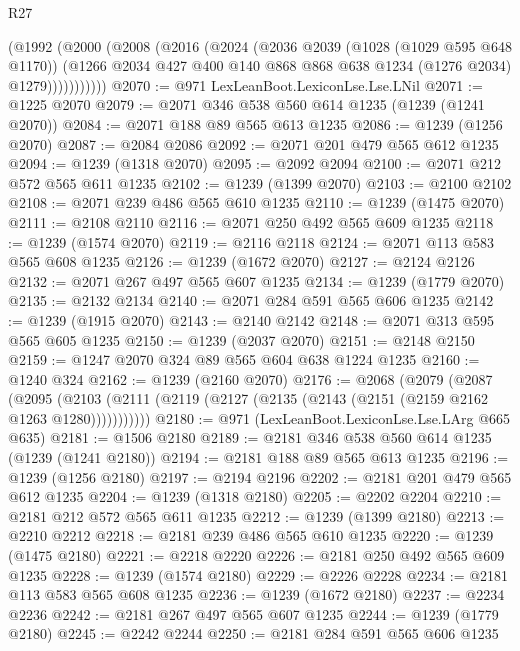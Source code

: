 \begin{lexlean}{R27}
\begin{coremodule}
            (@1992
              (@2000
                (@2008
                  (@2016
                    (@2024
                      (@2036
                        @2039
                        (@1028 (@1029 @595 @648 @1170))
                        (@1266
                          @2034
                          @427
                          @400
                          @140
                          @868
                          @868
                          @638
                          @1234
                          (@1276 @2034)
                          @1279)))))))))))
@2070 := @971 LexLeanBoot.LexiconLse.Lse.LNil
@2071 := @1225 @2070
@2079 := @2071 @346 @538 @560 @614 @1235 (@1239 (@1241 @2070))
@2084 := @2071 @188 @89 @565 @613 @1235
@2086 := @1239 (@1256 @2070)
@2087 := @2084 @2086
@2092 := @2071 @201 @479 @565 @612 @1235
@2094 := @1239 (@1318 @2070)
@2095 := @2092 @2094
@2100 := @2071 @212 @572 @565 @611 @1235
@2102 := @1239 (@1399 @2070)
@2103 := @2100 @2102
@2108 := @2071 @239 @486 @565 @610 @1235
@2110 := @1239 (@1475 @2070)
@2111 := @2108 @2110
@2116 := @2071 @250 @492 @565 @609 @1235
@2118 := @1239 (@1574 @2070)
@2119 := @2116 @2118
@2124 := @2071 @113 @583 @565 @608 @1235
@2126 := @1239 (@1672 @2070)
@2127 := @2124 @2126
@2132 := @2071 @267 @497 @565 @607 @1235
@2134 := @1239 (@1779 @2070)
@2135 := @2132 @2134
@2140 := @2071 @284 @591 @565 @606 @1235
@2142 := @1239 (@1915 @2070)
@2143 := @2140 @2142
@2148 := @2071 @313 @595 @565 @605 @1235
@2150 := @1239 (@2037 @2070)
@2151 := @2148 @2150
@2159 := @1247 @2070 @324 @89 @565 @604 @638 @1224 @1235
@2160 := @1240 @324
@2162 := @1239 (@2160 @2070)
@2176 := @2068
    (@2079
      (@2087
        (@2095 (@2103 (@2111 (@2119 (@2127 (@2135 (@2143 (@2151 (@2159 @2162 @1263 @1280)))))))))))
@2180 := @971 (LexLeanBoot.LexiconLse.Lse.LArg @665 @635)
@2181 := @1506 @2180
@2189 := @2181 @346 @538 @560 @614 @1235 (@1239 (@1241 @2180))
@2194 := @2181 @188 @89 @565 @613 @1235
@2196 := @1239 (@1256 @2180)
@2197 := @2194 @2196
@2202 := @2181 @201 @479 @565 @612 @1235
@2204 := @1239 (@1318 @2180)
@2205 := @2202 @2204
@2210 := @2181 @212 @572 @565 @611 @1235
@2212 := @1239 (@1399 @2180)
@2213 := @2210 @2212
@2218 := @2181 @239 @486 @565 @610 @1235
@2220 := @1239 (@1475 @2180)
@2221 := @2218 @2220
@2226 := @2181 @250 @492 @565 @609 @1235
@2228 := @1239 (@1574 @2180)
@2229 := @2226 @2228
@2234 := @2181 @113 @583 @565 @608 @1235
@2236 := @1239 (@1672 @2180)
@2237 := @2234 @2236
@2242 := @2181 @267 @497 @565 @607 @1235
@2244 := @1239 (@1779 @2180)
@2245 := @2242 @2244
@2250 := @2181 @284 @591 @565 @606 @1235

\end{coremodule}
\end{lexlean}
